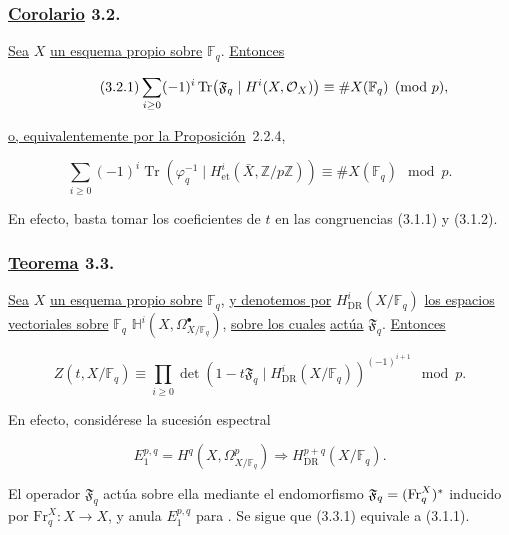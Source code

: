 \subsubsection*{\underline{Corolario} 3.2.}
\underline{Sea} $X$ \underline{un esquema propio sobre} $\mathbb F_q$. \underline{Entonces}

\begin{equation}\tag{3.2.1}
\sum_{i\geq0}(-1)^i
\operatorname{Tr}\!\left(\mathfrak F_q\mid H^i(X,\mathcal O_X)\sisi{\right.}{\right)}
\equiv \#X(\mathbb F_q)\pmod p,
\end{equation}

\underline{o, equivalentemente por la Proposición}~2.2.4,

\pageoriginale

\begin{equation}\tag{3.2.2}
\sum_{i\geq0}(-1)^i
\operatorname{Tr}\!\left(\varphi_q^{-1}\mid
H^i_{\mathrm{et}}(\bar X,\mathbb Z/p\mathbb Z)\right)
\equiv \#X(\mathbb F_q)\mod p.
\end{equation}

En efecto, basta tomar los coeficientes de $t$ en las congruencias (3.1.1)
y (3.1.2).

\subsubsection*{\underline{Teorema} 3.3.}
\underline{Sea} $X$ \underline{un esquema propio sobre} $\mathbb F_q$, \underline{y denotemos por}
$H^i_{\mathrm{DR}}(X/\mathbb F_q)$ \underline{los espacios vectoriales sobre}
$\mathbb F_q$ $\mathbb H^i(X,\Omega^\bullet_{X/\mathbb F_q})$, \underline{sobre los cuales}
\underline{actúa} $\mathfrak F_q$. \underline{Entonces}

\begin{equation}\tag{3.3.1}
Z(t,X/\mathbb F_q)
\equiv
\prod_{i\geq0}
\det\!\left(1-t\mathfrak F_q\mid
H^i_{\mathrm{DR}}(X/\mathbb F_q)\right)^{(-1)^{i+1}}
\mod p.
\end{equation}

En efecto, considérese la sucesión espectral

\begin{equation}\tag{3.3.2}
E_1^{p,q}=H^q(X,\Omega^p_{X/\mathbb F_q})
\Longrightarrow H^{p+q}_{\mathrm{DR}}(X/\mathbb F_q).
\end{equation}

El operador $\mathfrak F_q$ actúa sobre ella mediante el endomorfismo
$\mathfrak F_q=(\sisi{\mathrm{Fr}_p^X}{\mathrm{Fr}_q^X})^*$ inducido por
$\mathrm{Fr}_q^X:X\longrightarrow X$, y anula $E_1^{p,q}$ para
. Se sigue que (3.3.1) equivale a (3.1.1).

